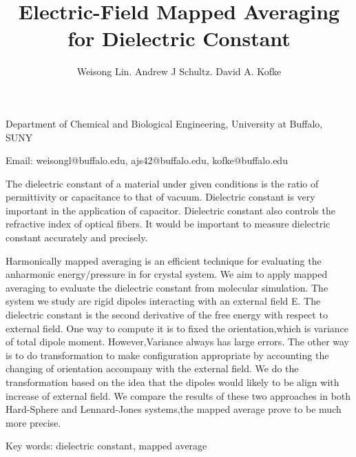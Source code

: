 \documentclass{article}
\begin{document}
\title{Electric-Field Mapped Averaging for Dielectric Constant}
\author{Weisong Lin. Andrew J Schultz. David A. Kofke}
\date{}
\maketitle
Department of Chemical and Biological Engineering, University at Buffalo, SUNY

Email: weisongl@buffalo.edu, ajs42@buffalo.edu, kofke@buffalo.edu


The dielectric constant of a material under given conditions is the ratio of permittivity or capacitance to that of vacuum. Dielectric constant is very important in the application of capacitor. Dielectric constant also controls the refractive index of  optical fibers. It would be important to measure dielectric constant accurately and precisely. 

Harmonically mapped averaging is an efficient technique for evaluating the anharmonic energy/pressure in for crystal system. We aim to apply mapped averaging to evaluate the dielectric constant from molecular simulation. The system we study are rigid dipoles  interacting with an external field E. The dielectric constant is the second derivative of the free energy with respect to external field. One way to compute it is to fixed the orientation,which is variance of total dipole moment. However,Variance always has large errors. The other way is to do transformation to make configuration appropriate by accounting the changing of orientation accompany with the external field. We do the transformation based on the idea that the dipoles would likely to be align with increase of external field. We compare the results of these two approaches in both Hard-Sphere and Lennard-Jones systems,the mapped average prove to be much more precise.


    
Key words: dielectric constant, mapped average
\end{document}
